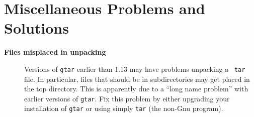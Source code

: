 \chapter{Miscellaneous Problems and Solutions}
\begin{description}
   \item[\textbf{Files misplaced in unpacking}] 
        Versions of \texttt{gtar} earlier than 1.13 may have problems unpacking
        a \cgal\ \texttt{tar} file.  In particular, files that should be 
        in subdirectories may get placed in the top directory.  This is 
        apparently due to a ``long name problem'' with earlier versions of
        \texttt{gtar}.  Fix this problem by either upgrading your installation
        of \texttt{gtar} or using simply \texttt{tar} (the non-Gnu program).
\end{description}
